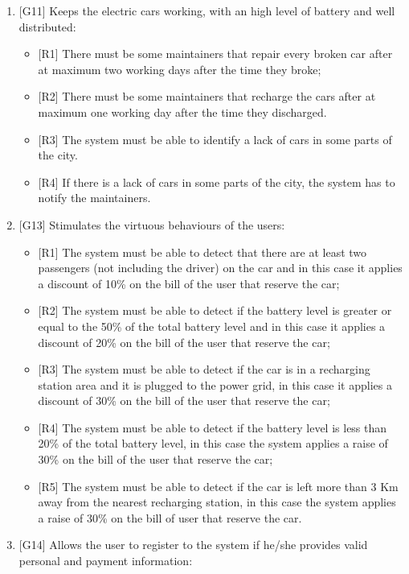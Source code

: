 \begin{enumerate}
\item {[G11]} Keeps the electric cars working, with an high level of battery and well distributed:

\begin{itemize}
	\item {[R1]} There must be some maintainers that repair every broken car after at maximum two working days after the time they broke;
	\item {[R2]} There must be some maintainers that recharge the cars after at maximum one working day after the time they discharged.
	\item {[R3]} The system must be able to identify a lack of cars in some parts of the city.
	\item {[R4]} If there is a lack of cars in some parts of the city, the system has to notify the maintainers.
\end{itemize}

\item {[G13]} Stimulates the virtuous behaviours of the users:

\begin{itemize}
	\item {[R1]} The system must be able to detect that there are at least two passengers (not including the driver) on the car and in this case it applies a discount of 10\% on the bill of the user that reserve the car;
	\item {[R2]} The system must be able to detect if  the battery level is greater or equal to the 50\% of the total battery level and in this case it applies a discount of 20\% on the bill of the user that reserve the car;
	\item {[R3]} The system must be able to detect if the car is in a recharging station area and it is plugged to the power grid, in this case it applies a discount of 30\% on the bill of the user that reserve the car;
	\item {[R4]} The system must be able to detect if the battery level is less than 20\% of the total battery level, in this case the system applies a raise of 30\% on the bill of the user that reserve the car;
	\item {[R5]} The system must be able to detect if the car is left more than 3 Km away from the nearest recharging station, in this case the system applies a raise of 30\% on the bill of user that reserve the car.
\end{itemize}

\item {[G14]} Allows the user to register to the system if he/she provides valid personal and payment information:


\end{enumerate}
